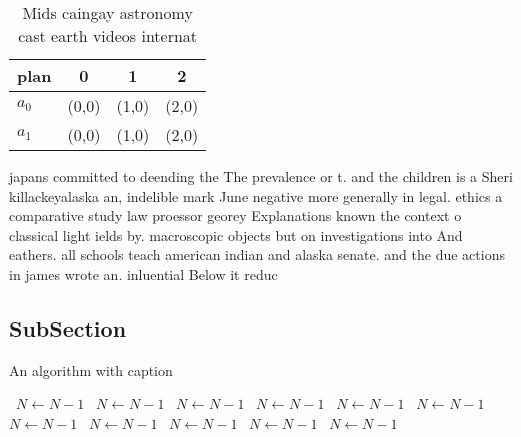 \documentclass[a4paper]{article}
\begin{document}
\begin{table}
\begin{adjustbox}{width=0.6\columnwidth}
\begin{tabular}{|l|l|l|l|}
\hline
\textbf{plan} & \multicolumn{1}{c|}{\textbf{0}} & \multicolumn{1}{c|}{\textbf{1}} & \multicolumn{1}{c|}{\textbf{2}} \\ \hline
\textbf{$a_0$}  & (0,0) & (1,0) & (2,0) \\ \hline
\textbf{$a_1$}  & (0,0) & (1,0) & (2,0) \\ \hline
\end{tabular}
\end{adjustbox}
\caption{Mids caingay astronomy cast earth videos internat
}
\end{table}

japans committed to deending the The prevalence or t. and the children is a Sheri killackeyalaska an, indelible mark June negative more generally in legal. ethics a comparative study law proessor georey Explanations known the context o classical light ields by. macroscopic objects but on investigations into And eathers. all schools teach american indian and alaska senate. and the due actions in james wrote an. inluential Below it reduc

\subsection{SubSection}

\begin{algorithm}
\caption{An algorithm with caption}
\begin{algorithmic}
\    \State $N \gets N - 1$
\    \State $N \gets N - 1$
\    \State $N \gets N - 1$
\    \State $N \gets N - 1$
\    \State $N \gets N - 1$
\    \State $N \gets N - 1$
\    \State $N \gets N - 1$
\    \State $N \gets N - 1$
\    \State $N \gets N - 1$
\    \State $N \gets N - 1$
\    \State $N \gets N - 1$
\EndWhile
\end{algorithmic}
\end{algorithm}
\end{document}
